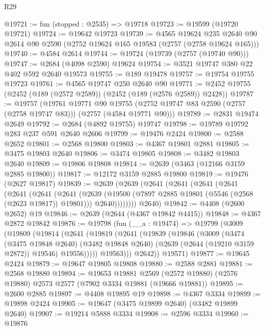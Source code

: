\begin{lexlean}{R29}
\begin{coremodule}
@19721 := fun (stopped : @2535) => @19718
@19723 := @19599 (@19720 @19721)
@19724 := @19642 @19723
@19739 := @4565
    @19624
    @235
    @2640
    @90
    @2614
    @90
    @2590
    (@2752 @19624 @165 @19583 (@2757 (@2758 @19624 @165)))
@19740 := @4584 @2614
@19744 := @19724 (@19739 (@2757 (@19740 @90)))
@19747 := @2684 (@4098 @2590) @19624
@19754 := @3521 @19747 @380 @22 @402 @592 @2640 @19573
@19755 := @189 @19478
@19757 := @19754 @19755 @19723
@19761 := @4565 @19747 @250 @2640 @90
@19771 := @2452 @19755 (@2452 (@189 (@2572 @2589)) (@2452 (@189 (@2576 @2589)) @2428))
@19787 := @19757
    (@19761
      @19771
      @90
      @19755
      (@2752 @19747 @83 @2590 (@2757 (@2758 @19747 @83)))
      (@2757 (@4584 @19771 @90)))
@19789 := @2831 @19474 @2649
@19792 := @2684 (@4892 @19755) @19747
@19798 := @19789 @19792 @283 @237 @591 @2640 @2606
@19799 := @19476 @2424
@19800 := @2588 @2652
@19801 := @2568 @19800
@19803 := @4367 @19801 @2881
@19805 := @3475 @19803 @2640
@19806 := @3474 @19805
@19808 := @3482 @19803 @2640
@19809 := @19806 @19808
@19814 := @2639 (@3463 (@12166 @3159 @2885 @19800))
@19817 := @12172 @3159 @2885 @19800
@19819 := @19476 (@2627 @19817)
@19839 := @2639
    (@2639
      (@2641
        (@2641
          (@2641
            (@2641
              (@2641
                (@2641
                  (@2641
                    (@2639
                      (@19500 (@7897 @2885 @19801 (@5546 (@2568 (@2623 @19817)) @19801)))
                      @2640))))))))
      @2640)
@19842 := @4408 (@2600 @2652) @19
@19846 := @2639 (@2644 (@4367 @19842 @4415))
@19848 := @4367 @2872 @19842
@19876 := @19798
    (fun (__a : @19474) =>
    @19799
      (@3009
        (@19809
          (@19814
            (@2641
              (@19819
                (@2641
                  (@19839
                    (@19846
                      (@3009
                        (@3474
                          (@3475 @19848 @2640)
                          (@3482 @19848 @2640)
                          (@2639 (@2644 (@19210 @3159 @2872)) @19546)
                          @19556)))))
                @19563)))
          @2642))
      @19571)
@19877 := @19645 @2424
@19879 := @19647 @19805 @19808
@19880 := @2588 @2881
@19881 := @2568 @19880
@19894 := @19653
    @19881
    @2569
    (@2572 @19880)
    (@2576 @19880)
    @2573
    @2577
    (@7902 @3334 @19881 (@19666 @19881))
@19895 := @2600 @2885
@19897 := @4408 @19895 @19
@19898 := @4367 @3334
@19899 := @19898 @2424
@19905 := @19647 (@3475 @19899 @2640) (@3482 @19899 @2640)
@19907 := @19214 @5888 @3334
@19908 := @2596 @3334
@19960 := @19876

\end{coremodule}
\end{lexlean}
